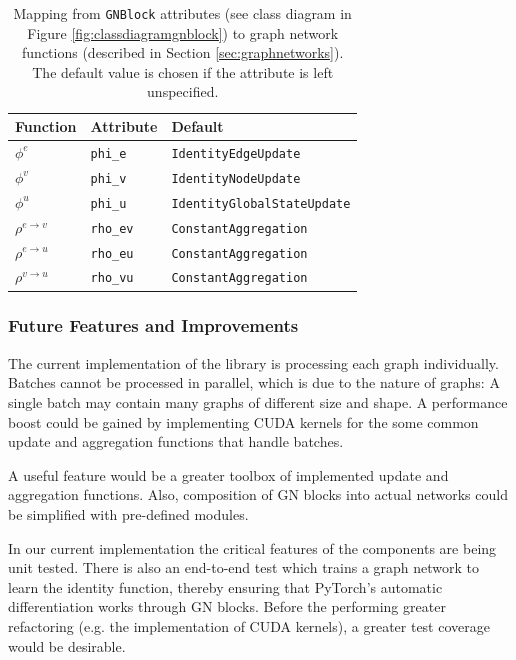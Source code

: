 \begin{table}
    \centering
    \begin{tabular}{ l l l }
        \hline
        \textbf{Function} & \textbf{Attribute} & \textbf{Default}\\
        \hline
        $\phi^e$ & \texttt{phi\_e} & \texttt{IdentityEdgeUpdate} \\
        $\phi^v$ & \texttt{phi\_v} & \texttt{IdentityNodeUpdate} \\
        $\phi^u$ & \texttt{phi\_u} & \texttt{IdentityGlobalStateUpdate} \\
        $\rho^{e\rightarrow v}$ & \texttt{rho\_ev} & \texttt{ConstantAggregation} \\
        $\rho^{e\rightarrow u}$ & \texttt{rho\_eu} & \texttt{ConstantAggregation} \\
        $\rho^{v\rightarrow u}$ & \texttt{rho\_vu} & \texttt{ConstantAggregation} \\
        \hline
    \end{tabular}
    \caption[Mapping from \texttt{GNBlock} attributes to graph network functions]{Mapping from \texttt{GNBlock} attributes (see class diagram in Figure \ref{fig:classdiagramgnblock}) to graph network functions (described in Section \ref{sec:graphnetworks}). The default value is chosen if the attribute is left unspecified.}
    \label{tab:gnblockattrs}
\end{table}

\subsubsection{Future Features and Improvements}

The current implementation of the library is processing each graph individually. Batches cannot be processed in parallel, which is due to the nature of graphs: A single batch may contain many graphs of different size and shape. A performance boost could be gained by implementing CUDA kernels for the some common update and aggregation functions that handle batches.

A useful feature would be a greater toolbox of implemented update and aggregation functions. Also, composition of GN blocks into actual networks could be simplified with pre-defined modules.

In our current implementation the critical features of the components are being unit tested. There is also an end-to-end test which trains a graph network to learn the identity function, thereby ensuring that PyTorch's automatic differentiation works through GN blocks. Before the performing greater refactoring (e.g. the implementation of CUDA kernels), a greater test coverage would be desirable.
